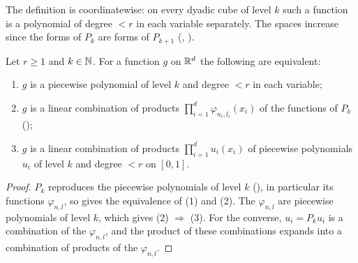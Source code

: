 The definition is coordinatewise: on every dyadic cube of level $k$ such a function is a
polynomial of degree $< r$ in each variable separately. The spaces increase since the forms of
$P_k$ are forms of $P_{k+1}$ (, ).

\begin{lemma}
\label{lem:cube-pp-tensor}
\leanok
{}
Let $r \geq 1$ and $k \in \mathbb{N}$. For a function $g$ on $\mathbb{R}^d$ the following are equivalent:
\begin{enumerate}
  \item $g$ is a piecewise polynomial of level $k$ and degree $< r$ in each variable;
  \item $g$ is a linear combination of products $\prod_{i=1}^d \varphi_{n_i, l_i}(x_i)$ of the
    functions of $P_k$ ();
  \item $g$ is a linear combination of products $\prod_{i=1}^d u_i(x_i)$ of piecewise polynomials
    $u_i$ of level $k$ and degree $< r$ on $[0, 1]$.
\end{enumerate}
\end{lemma}

\begin{proof}
\leanok
$P_k$ reproduces the piecewise polynomials of level $k$ (), in particular its
functions $\varphi_{n,l}$, so  gives the equivalence of (1) and (2). The
$\varphi_{n,l}$ are piecewise polynomials of level $k$, which gives (2) $\Rightarrow$ (3). For the
converse, $u_i = P_k u_i$ is a combination of the $\varphi_{n,l}$, and the product of these
combinations expands into a combination of products of the $\varphi_{n,l}$.
\end{proof}

